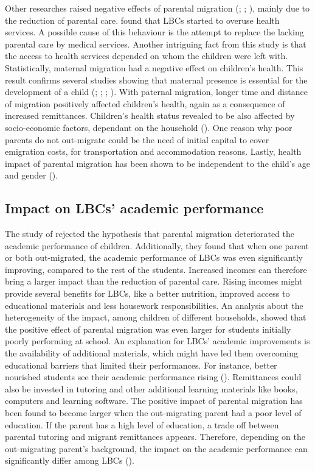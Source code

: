 Other researches raised negative effects of parental migration (\cite{amato1999nonresident}; \cite{kanaiaupuni2000reframing}; \cite{fernandez1998fathers}), mainly due to the reduction of parental care. \textcite{song2009health} found that LBCs started to overuse health services. A possible cause of this behaviour is the attempt to replace the lacking parental care by medical services. Another intriguing fact from this study is that the access to health services depended on whom the children were left with. Statistically, maternal migration had a negative effect on children's health. This result confirms several studies showing that maternal presence is essential for the development of a child (\cite{cortes2015feminization}; \cite{jampaklay2006parental}; \cite{macours2010seasonal}; \cite{thomas1994like}). With paternal migration, longer time and distance of migration positively affected children's health, again as a consequence of increased remittances. Children's health status revealed to be also affected by socio-economic factors, dependant on the household (\cite{behrman1996impact}). One reason why poor parents do not out-migrate could be the need of initial capital to cover emigration costs, for transportation and accommodation reasons. Lastly, health impact of parental migration has been shown to be independent to the child's age and gender (\cite{guo2017effect}). 

\subsection{Impact on LBCs' academic performance}

The study of \textcite{bai2017effect} rejected the hypothesis that parental migration deteriorated the academic performance of children. Additionally, they found that when one parent or both out-migrated, the academic performance of LBCs was even significantly improving, compared to the rest of the students. Increased incomes can therefore bring a larger impact than the reduction of parental care. Rising incomes might provide several benefits for LBCs, like a better nutrition, improved access to educational materials and less housework responsibilities. An analysis about the heterogeneity of the impact, among children of different households, showed that the positive effect of parental migration was even larger for students initially poorly performing at school. An explanation for LBCs' academic improvements is the availability of additional materials, which might have led them overcoming educational barriers that limited their performances. For instance, better nourished students see their academic performance rising (\cite{luo2012nutrition}). Remittances could also be invested in tutoring and other additional learning materials like books, computers and learning software. The positive impact of parental migration has been found to become larger when the out-migrating parent had a poor level of education. If the parent has a high level of education, a trade off between parental tutoring and migrant remittances appears. Therefore, depending on the out-migrating parent's background, the impact on the academic performance can significantly differ among LBCs (\cite{sawyer2016money}). 

